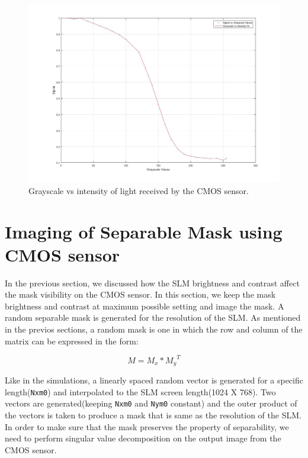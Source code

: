 \begin{figure}[!htbp]
\centering
\includegraphics[scale=0.35]{pics/slm/grayscale_slm_graph.jpg}
\caption{Grayscale vs intensity of light received by the CMOS sensor.}
\label{fig:grayscale_slm_graph}
\end{figure}

\section{Imaging of Separable Mask using CMOS sensor}
In the previous section, we discussed how the SLM brightness and contrast affect the mask visibility on the CMOS sensor. In this section, we keep the mask brightness and contrast at maximum possible setting and image the mask. A random separable mask is generated for the resolution of the SLM. As mentioned in the previos sections, a random mask is one in which the row and column of the matrix can be expressed in the form:

$$
M = M_{x} * {M_{y}}^T
$$

Like in the simulations, a linearly spaced random vector is generated for a specific length(\texttt{Nxm0}) and interpolated to the SLM screen length(1024 X 768). Two vectors are generated(keeping \texttt{Nxm0} and \texttt{Nym0} constant) and the outer product of the vectors is taken to produce a mask that is same as the resolution of the SLM.
In order to make sure that the mask preserves the property of separability, we need to perform singular value decomposition on the output image from the CMOS sensor.

